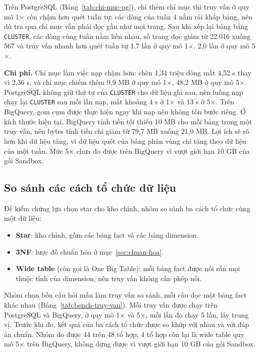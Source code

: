 Trên PostgreSQL (Bảng~\ref{tab:chi-muc-pg}), chỉ thêm chỉ mục thì truy vấn ở quy mô 1$\times$ còn
chậm hơn quét tuần tự: các dòng của tuần 4 nằm rải khắp bảng, nên dù tra qua chỉ mục vẫn phải đọc
gần như mọi trang. Sau khi xếp lại bảng bằng \texttt{CLUSTER}, các dòng cùng tuần nằm liền nhau,
số trang đọc giảm từ 22.016 xuống 567 và truy vấn nhanh hơn quét tuần tự 1,7 lần ở quy mô
1$\times$, 2,0 lần ở quy mô 5$\times$.

\textbf{Chi phí.} Chỉ mục làm việc nạp chậm hơn: chèn 1,34 triệu dòng mất 4,52 s thay vì 2,36 s,
và chỉ mục chiếm thêm 9,9 MB ở quy mô 1$\times$, 48,2 MB ở quy mô 5$\times$. PostgreSQL không giữ
thứ tự của \texttt{CLUSTER} cho dữ liệu ghi sau, nên luồng nạp chạy lại \texttt{CLUSTER} sau mỗi
lần nạp, mất khoảng 4 s ở 1$\times$ và 13 s ở 5$\times$. Trên BigQuery, gom cụm được thực hiện
ngay khi nạp nên không tốn bước riêng. Ở kích thước hiện tại, BigQuery tính tiền tối thiểu 10 MB
cho mỗi bảng trong một truy vấn, nên bytes tính tiền chỉ giảm từ 79,7 MB xuống 21,0 MB. Lợi ích sẽ
rõ hơn khi dữ liệu tăng, vì dữ liệu quét của bảng phân vùng chỉ tăng theo dữ liệu của một tuần.
Mức 5$\times$ chưa đo được trên BigQuery vì vượt giới hạn 10 GB của gói Sandbox.

\subsection{So sánh các cách tổ chức dữ liệu}
\label{sec:benchmark}

Để kiểm chứng lựa chọn star cho kho chính, nhóm so sánh ba cách tổ chức cùng một dữ liệu:

\begin{itemize}
  \item \textbf{Star}: kho chính, gồm các bảng fact và các bảng dimension.
  \item \textbf{3NF}: lược đồ chuẩn hóa ở mục~\ref{sec:chuan-hoa}.
  \item \textbf{Wide table} (còn gọi là One Big Table): mỗi bảng fact được nối sẵn mọi thuộc tính
        của dimension, nên truy vấn không cần phép nối.
\end{itemize}

Nhóm chọn bốn câu hỏi mẫu làm truy vấn so sánh, mỗi câu đọc một bảng fact khác nhau
(Bảng~\ref{tab:bench-truy-van}). Mỗi truy vấn được chạy trên
PostgreSQL và BigQuery, ở quy mô 1$\times$ và 5$\times$, mỗi lần đo chạy 5 lần, lấy trung vị. Trước
khi đo, kết quả của ba cách tổ chức được so khớp với nhau và với đáp án chuẩn. Nhóm đo được 44 trên
48 tổ hợp; 4 tổ hợp còn lại là wide table quy mô 5$\times$ trên BigQuery, không dựng được vì vượt
giới hạn 10 GB của gói Sandbox.


